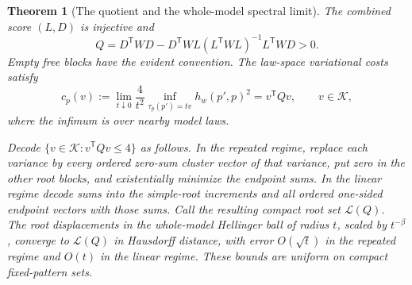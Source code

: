 \documentclass[11pt,reqno]{amsart}
\numberwithin{equation}{section}
\newtheorem{theorem}{Theorem}[section]
\theoremstyle{definition}
\theoremstyle{remark}
\newcommand{\cK}{\mathcal K}
\newcommand{\cL}{\mathcal L}
\begin{document}
\begin{theorem}[The quotient and the whole-model spectral limit]\label{thm:local}
The combined score $(L,D)$ is injective and
\begin{equation}\label{eq:quotient}
 Q=D^{\mathsf T}WD-D^{\mathsf T}WL(L^{\mathsf T}WL)^{-1}L^{\mathsf T}WD>0.
\end{equation}
Empty free blocks have the evident convention. The law-space variational costs satisfy
\begin{equation}\label{eq:oracle}
 c_p(v):=\lim_{t\downarrow0}\frac4{t^2}
 \inf_{\tau_p(p')=tv}h_w(p',p)^2=v^{\mathsf T}Qv,
 \qquad v\in\cK,
\end{equation}
where the infimum is over nearby model laws.

Decode $\{v\in\cK:v^{\mathsf T}Qv\le4\}$ as follows. In the repeated regime, replace each variance by every ordered zero-sum cluster vector of that variance, put zero in the other root blocks, and existentially minimize the endpoint sums. In the linear regime decode sums into the simple-root increments and all ordered one-sided endpoint vectors with those sums. Call the resulting compact root set $\cL(Q)$. The root displacements in the whole-model Hellinger ball of radius $t$, scaled by $t^{-\beta}$, converge to $\cL(Q)$ in Hausdorff distance, with error $O(\sqrt t)$ in the repeated regime and $O(t)$ in the linear regime. These bounds are uniform on compact fixed-pattern sets.
\end{theorem}
\end{document}
